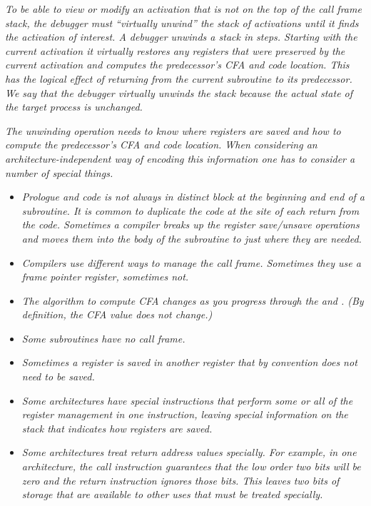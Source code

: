 \textit{To be able to view or modify an activation that is not
on the top of the call frame stack, the debugger must
``virtually unwind'' the stack of activations until
it finds the activation of interest.  A debugger unwinds
a stack in steps. Starting with the current activation it
virtually restores any registers that were preserved by the
current activation and computes the predecessor’s CFA and
code location. This has the logical effect of returning from
the current subroutine to its predecessor. We say that the
debugger virtually unwinds the stack because the actual state
of the target process is unchanged.}

\textit{The unwinding operation needs to know where registers are
saved and how to compute the predecessor’s CFA and code
location. When considering an architecture-independent way
of encoding this information one has to consider a number of
special things.}


\begin{itemize} %

\item \textit{Prologue 
and 
 code is not always in 
distinct block
at the beginning and end of a subroutine. It is common
to duplicate the  code 
at the site of each return
from the code. Sometimes a compiler breaks up the register
save/unsave operations and moves them into the body of the
subroutine to just where they are needed.}


\item \textit{Compilers use different ways to manage the call
frame. Sometimes they use a frame pointer register, sometimes
not.}

\item \textit{The algorithm to compute CFA changes as you progress through
the  
and . 
(By definition, the CFA value
does not change.)}

\item \textit{Some subroutines have no call frame.}

\item \textit{Sometimes a register is saved in another register that by
convention does not need to be saved.}

\item \textit{Some architectures have special instructions that perform
some or all of the register management in one instruction,
leaving special information on the stack that indicates how
registers are saved.}

\item \textit{Some architectures treat return address values specially. For
example, in one architecture, the call instruction guarantees
that the low order two bits will be zero and the return
instruction ignores those bits. This leaves two bits of
storage that are available to other uses that must be treated
specially.}


\end{itemize}


